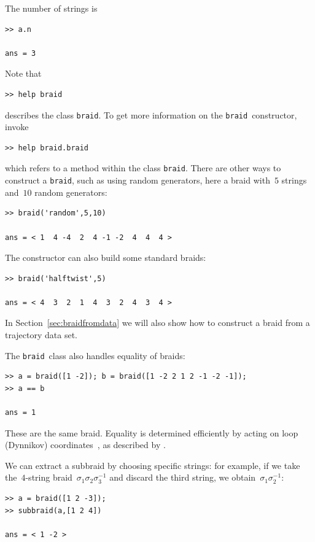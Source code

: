 \documentclass[12pt]{article}
\newcommand{\braid}{\texttt{braid}}%
\begin{document}
The number of strings is
\begin{lstlisting}[frame=single,framerule=0pt]
>> a.n

ans = 3
\end{lstlisting}
Note that
\begin{lstlisting}[frame=single,framerule=0pt]
>> help braid
\end{lstlisting}
describes the class \braid.  To get more information on the \braid\
constructor, invoke
\begin{lstlisting}[frame=single,framerule=0pt]
>> help braid.braid
\end{lstlisting}
which refers to a method within the class \braid.  There are other
ways to construct a \braid, such as using random generators, here a
braid with~$5$ strings and~$10$ random generators:
\begin{lstlisting}[frame=single,framerule=0pt]
>> braid('random',5,10)

ans = < 1  4 -4  2  4 -1 -2  4  4  4 >
\end{lstlisting}
The constructor can also build some standard braids:
\begin{lstlisting}[frame=single,framerule=0pt]
>> braid('halftwist',5)

ans = < 4  3  2  1  4  3  2  4  3  4 >
\end{lstlisting}
In Section~\ref{sec:braidfromdata} we will also show how to construct
a braid from a trajectory data set.

The \braid\ class also handles equality of braids:
\begin{lstlisting}[frame=single,framerule=0pt]
>> a = braid([1 -2]); b = braid([1 -2 2 1 2 -1 -2 -1]);
>> a == b

ans = 1
\end{lstlisting}
These are the same braid.  Equality is determined efficiently by
acting on loop (Dynnikov) coordinates~\citep{Dynnikov2002}, as
described by \citet{Dehornoy2008}.

We can extract a subbraid by choosing specific strings: for example,
if we take the~$4$-string braid~$\sigma_1\sigma_2\sigma_3^{-1}$ and
discard the third string, we obtain~$\sigma_1\sigma_2^{-1}$:
\begin{lstlisting}[frame=single,framerule=0pt]
>> a = braid([1 2 -3]);
>> subbraid(a,[1 2 4])

ans = < 1 -2 >
\end{lstlisting}
\end{document}
